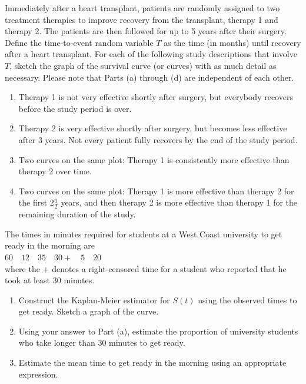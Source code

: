 \documentclass[
]{report}
\begin{document}
\begin{list}{E.}{ \setlength{\itemsep}{1.2em}}
  \item Immediately after a heart transplant, patients are randomly assigned to two treatment therapies to improve recovery from the transplant, therapy 1 and therapy 2. The patients are then followed for up to 5 years after their surgery. Define the time-to-event random variable $T$ as the time (in months) until recovery after a heart transplant. For each of the following study descriptions that involve $T$, sketch the graph of the survival curve (or curves) with as much detail as necessary. Please note that Parts (a) through (d) are independent of each other.
  \begin{enumerate}
    \item Therapy 1 is not very effective shortly after surgery, but everybody recovers before the study period is over.
    \item Therapy 2 is very effective shortly after surgery, but becomes less effective after 3 years. Not every patient fully recovers by the end of the study period.
    \item Two curves on the same plot: Therapy 1 is consistently more effective than therapy 2 over time.
    \item Two curves on the same plot: Therapy 1 is more effective than therapy 2 for the first $2\frac{1}{2}$ years, and then therapy 2 is more effective than therapy 1 for the remaining duration of the study.
  \end{enumerate}

  \item The times in minutes required for students at a West Coast university to get ready in the morning are\\
  \hspace*{1em} $60 \quad 12 \quad 35 \quad 30+ \quad 5 \quad 20$\\
  where the $+$ denotes a right-censored time for a student who reported that he took at least 30 minutes.
  \begin{enumerate}
    \item Construct the Kaplan-Meier estimator for $S(t)$ using the observed times to get ready. Sketch a graph of the curve.
    \item Using your answer to Part (a), estimate the proportion of university students who take longer than 30 minutes to get ready.
    \item Estimate the mean time to get ready in the morning using an appropriate expression.
  \end{enumerate}


\end{list}
\end{document}
